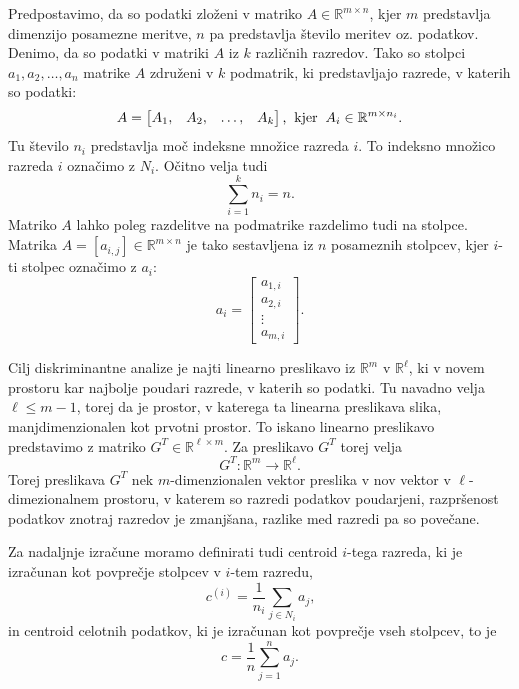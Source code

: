 \documentclass[mat1]{article}
\begin{document}
Predpostavimo, da so podatki zloženi v matriko $A \in \mathbb{R}^{m \times n}$, kjer $m$ predstavlja dimenzijo posamezne meritve, $n$ pa predstavlja število meritev oz. podatkov. Denimo, da so podatki v matriki $A$ iz $k$ različnih razredov. Tako so stolpci $a_1, a_2, \ldots, a_n$ matrike $A$ združeni v $k$ podmatrik, ki predstavljajo razrede, v katerih so podatki:
$$ A = 
\begin{bmatrix}
A_1, & A_2, & \ldots, & A_k
\end{bmatrix} \text{,}
\hspace{2mm} \text{kjer} \hspace{2mm} A_i \in \mathbb{R}^{m \times n_i} \text{.}
$$ 
Tu število $n_i$ predstavlja moč indeksne množice razreda $i$. To indeksno množico razreda $i$ označimo z $N_i$. Očitno velja tudi $$
\sum_{i=1}^{k}n_i = n \text{.}$$
Matriko $A$ lahko poleg razdelitve na podmatrike razdelimo tudi na stolpce. Matrika $A = \left[ a_{i ,j} \right]  \in \mathbb{R}^{m \times n}$ je tako sestavljena iz $n$ posameznih stolpcev, kjer $i$-ti stolpec označimo z $a_i$:
$$ a_i =
\begin{bmatrix}
a_{1, i} \\
a_{2, i} \\
\vdots \\
a_{m, i}
\end{bmatrix}
\text{.}
$$

Cilj diskriminantne analize je najti linearno preslikavo iz $\mathbb{R}^m$ v $\mathbb{R}^\ell$, ki v novem prostoru kar najbolje poudari razrede, v katerih so podatki. Tu navadno velja $\ell \leq m - 1$, torej da je prostor, v katerega ta linearna preslikava slika, manjdimenzionalen kot prvotni prostor. To iskano linearno preslikavo predstavimo z matriko $G^T \in \mathbb{R}^{\ell \times m}$.
Za preslikavo $G^T$ torej velja $$G^T : \mathbb{R}^m \rightarrow \mathbb{R}^\ell \text{.}$$ Torej preslikava $G^T$ nek $m$-dimenzionalen vektor preslika v nov vektor v $\ell$-dimezionalnem prostoru, v katerem so razredi podatkov poudarjeni, razpršenost podatkov znotraj razredov je zmanjšana, razlike med razredi pa so povečane.

Za nadaljnje izračune moramo definirati tudi centroid $i$-tega razreda, ki je izračunan kot povprečje stolpcev v $i$-tem razredu, 
$$c^{(i)} = \frac{1}{n_i} \sum_{j \in N_i} a_j \text{,}
$$
in centroid celotnih podatkov, ki je izračunan kot povprečje vseh stolpcev, to je
$$c = \frac{1}{n} \sum_{j = 1}^{n} a_j \text{.}
$$
\end{document}

